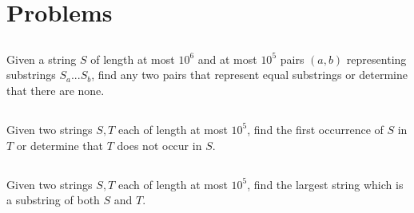 \documentclass{article}
\begin{document}
\section{Problems}
\subsection{}
Given a string $S$ of length at most $10^6$ and at most $10^5$ pairs $(a, b)$ representing substrings $S_a...S_b$, find any two pairs that represent equal substrings or determine that there are none.
\subsection{}
Given two strings $S, T$ each of length at most $10^5$, find the first occurrence of $S$ in $T$ or determine that $T$ does not occur in $S$.
\subsection{}
Given two strings $S, T$ each of length at most $10^5$, find the largest string which is a substring of both $S$ and $T$.
\end{document}
